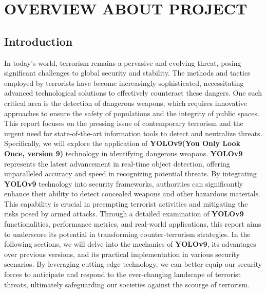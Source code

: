 \chapter{OVERVIEW ABOUT PROJECT}

\renewcommand{\headrulewidth}{0.5pt}
\renewcommand{\footrulewidth}{0.5pt}
\thispagestyle{plain}
\pagestyle{fancy}
\fancyhf{}
\raggedright
{}

\justifying

\section{Introduction}
    In today's world, terrorism remains a pervasive and evolving threat, posing significant challenges to global security and stability. The methods and tactics employed by terrorists have become increasingly sophisticated, necessitating advanced technological solutions to effectively counteract these dangers. One such critical area is the detection of dangerous weapons, which requires innovative approaches to ensure the safety of populations and the integrity of public spaces. \\ 
    \vspace{3mm}
    This report focuses on the pressing issue of contemporary terrorism and the urgent need for state-of-the-art information tools to detect and neutralize threats. Specifically, we will explore the application of \textbf{YOLOv9(You Only Look Once, version 9)}  technology in identifying dangerous weapons. \textbf{YOLOv9} represents the latest advancement in real-time object detection, offering unparalleled accuracy and speed in recognizing potential threats.
    \vspace{3mm}
    By integrating \textbf{YOLOv9} technology into security frameworks, authorities can significantly enhance their ability to detect concealed weapons and other hazardous materials. This capability is crucial in preempting terrorist activities and mitigating the risks posed by armed attacks. Through a detailed examination of \textbf{YOLOv9} functionalities, performance metrics, and real-world applications, this report aims to underscore its potential in transforming counter-terrorism strategies.
    \vspace{3mm}
    In the following sections, we will delve into the mechanics of \textbf{YOLOv9}, its advantages over previous versions, and its practical implementation in various security scenarios. By leveraging cutting-edge technology, we can better equip our security forces to anticipate and respond to the ever-changing landscape of terrorist threats, ultimately safeguarding our societies against the scourge of terrorism.

